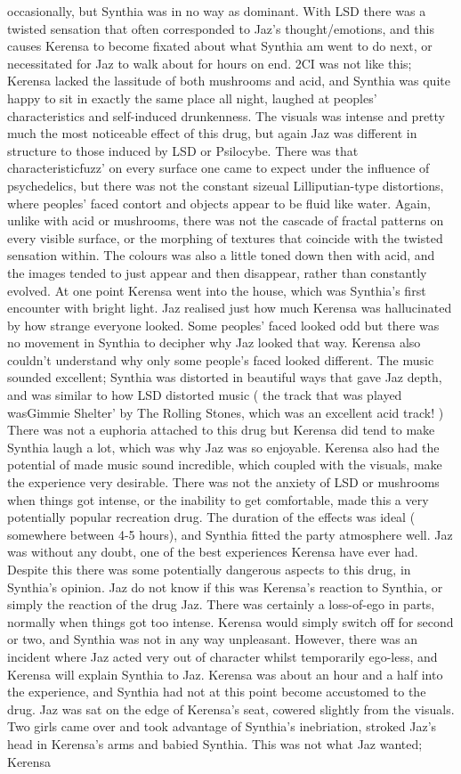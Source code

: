 \documentclass[12pt]{book}
\begin{document}
occasionally, but Synthia was in no way as dominant. With LSD there was a twisted sensation that often corresponded to Jaz's thought/emotions, and this causes Kerensa to become fixated about what Synthia am went to do next, or necessitated for Jaz to walk about for hours on end. 2CI was not like this; Kerensa lacked the lassitude of both mushrooms and acid, and Synthia was quite happy to sit in exactly the same place all night, laughed at peoples' characteristics and self-induced drunkenness. The visuals was intense and pretty much the most noticeable effect of this drug, but again Jaz was different in structure to those induced by LSD or Psilocybe. There was that characteristicfuzz' on every surface one came to expect under the influence of psychedelics, but there was not the constant sizeual Lilliputian-type distortions, where peoples' faced contort and objects appear to be fluid like water. Again, unlike with acid or mushrooms, there was not the cascade of fractal patterns on every visible surface, or the morphing of textures that coincide with the twisted sensation within. The colours was also a little toned down then with acid, and the images tended to just appear and then disappear, rather than constantly evolved. At one point Kerensa went into the house, which was Synthia's first encounter with bright light. Jaz realised just how much Kerensa was hallucinated by how strange everyone looked. Some peoples' faced looked odd but there was no movement in Synthia to decipher why Jaz looked that way. Kerensa also couldn't understand why only some people's faced looked different. The music sounded excellent; Synthia was distorted in beautiful ways that gave Jaz depth, and was similar to how LSD distorted music ( the track that was played wasGimmie Shelter' by The Rolling Stones, which was an excellent acid track! ) There was not a euphoria attached to this drug but Kerensa did tend to make Synthia laugh a lot, which was why Jaz was so enjoyable. Kerensa also had the potential of made music sound incredible, which coupled with the visuals, make the experience very desirable. There was not the anxiety of LSD or mushrooms when things got intense, or the inability to get comfortable, made this a very potentially popular recreation drug. The duration of the effects was ideal ( somewhere between 4-5 hours), and Synthia fitted the party atmosphere well. Jaz was without any doubt, one of the best experiences Kerensa have ever had. Despite this there was some potentially dangerous aspects to this drug, in Synthia's opinion. Jaz do not know if this was Kerensa's reaction to Synthia, or simply the reaction of the drug Jaz. There was certainly a loss-of-ego in parts, normally when things got too intense. Kerensa would simply switch off for second or two, and Synthia was not in any way unpleasant. However, there was an incident where Jaz acted very out of character whilst temporarily ego-less, and Kerensa will explain Synthia to Jaz. Kerensa was about an hour and a half into the experience, and Synthia had not at this point become accustomed to the drug. Jaz was sat on the edge of Kerensa's seat, cowered slightly from the visuals. Two girls came over and took advantage of Synthia's inebriation, stroked Jaz's head in Kerensa's arms and babied Synthia. This was not what Jaz wanted; Kerensa 
\end{document}
